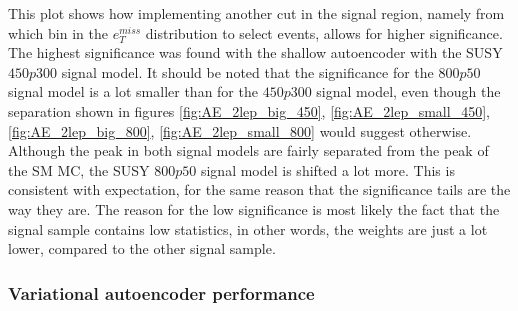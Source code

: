 This plot shows how implementing another cut in the signal region, 
namely from which bin in the $e_T^{miss}$ distribution to select events, allows for higher significance.
The highest significance was found with the shallow autoencoder with the SUSY $450p300$ signal model. 
It should be noted that the significance 
for the $800p50$ signal model is a lot smaller than for the $450p300$ signal model, even though the separation 
shown in figures \ref{fig:AE_2lep_big_450}, \ref{fig:AE_2lep_small_450}, \ref{fig:AE_2lep_big_800}, 
\ref{fig:AE_2lep_small_800} would suggest otherwise. Although the peak in both signal models are fairly 
separated from the peak of the SM MC, the SUSY $800p50$ signal model is shifted a lot more. This is 
consistent with expectation, for the same reason that the significance tails are the way they are.
The reason for the low significance is most likely the fact that the signal sample contains low statistics, 
in other words, the weights are just a lot lower, compared to the other signal sample. \par

\subsubsection*{Variational autoencoder performance}

